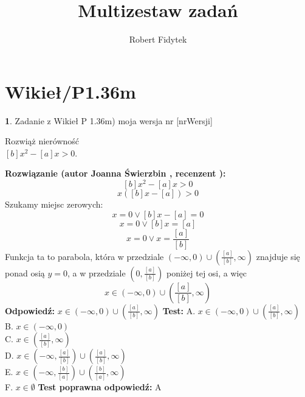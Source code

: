 \documentclass[12pt, a4paper]{article}
\title{Multizestaw zadań}
\author{Robert Fidytek}
\date{}
\theoremstyle{definition} %
\newtheorem{zad}{}
\newcommand{\kategoria}[1]{\section{#1}} %
\newcommand{\zadStart}[1]{\begin{zad}#1\newline} %
\newcommand{\zadStop}{\end{zad}}   %
\newcommand{\rozwStart}[2]{\noindent \textbf{Rozwiązanie (autor #1 , recenzent #2): }\newline} %
\newcommand{\rozwStop}{\newline}                                            %
\newcommand{\odpStart}{\noindent \textbf{Odpowiedź:}\newline}    %
\newcommand{\odpStop}{\newline}                                             %
\newcommand{\testStart}{\noindent \textbf{Test:}\newline} %
\newcommand{\testStop}{\newline} %
\newcommand{\kluczStart}{\noindent \textbf{Test poprawna odpowiedź:}\newline} %
\newcommand{\kluczStop}{\newline} %
\begin{document}
\maketitle


\kategoria{Wikieł/P1.36m}
\zadStart{Zadanie z Wikieł P 1.36m) moja wersja nr [nrWersji]}

Rozwiąż nierówność \\ $[b]x^2-[a]x>0$.
\zadStop
\rozwStart{Joanna Świerzbin}{}
$$[b]x^2-[a]x>0$$
$$x ([b]x-[a])>0$$
Szukamy miejsc zerowych:
$$x=0 \vee [b]x-[a]=0$$
$$x=0 \vee [b]x=[a]$$
$$x=0 \vee x=\frac{[a]}{[b]}$$
Funkcja ta to parabola, która w przedziale $\left( -\infty,0\right)\cup \left(\frac{[a]}{[b]} , \infty \right)$ znajduje się ponad osią $y=0$, a w przedziale $\left( 0, \frac{[a]}{[b]} \right)$ poniżej tej osi, a więc 
$$x \in \left( -\infty,0\right)\cup \left(\frac{[a]}{[b]} , \infty \right)$$
\rozwStop
\odpStart
$x \in \left( -\infty,0\right)\cup \left(\frac{[a]}{[b]} , \infty \right)$
\odpStop
\testStart
A. $x \in \left( -\infty,0\right)\cup \left(\frac{[a]}{[b]} , \infty \right)$\\
B. $x \in \left( -\infty,0\right)$ \\
C. $x \in \left(\frac{[a]}{[b]} , \infty \right)$ \\
D. $x \in \left( -\infty,\frac{[a]}{[b]}\right)\cup \left(\frac{[a]}{[b]} , \infty \right)$\\
E. $x \in \left( -\infty,\frac{[b]}{[a]}\right)\cup \left(\frac{[b]}{[a]} , \infty \right)$\\
F. $ x \in \emptyset $
\testStop
\kluczStart
A
\kluczStop
\end{document}
